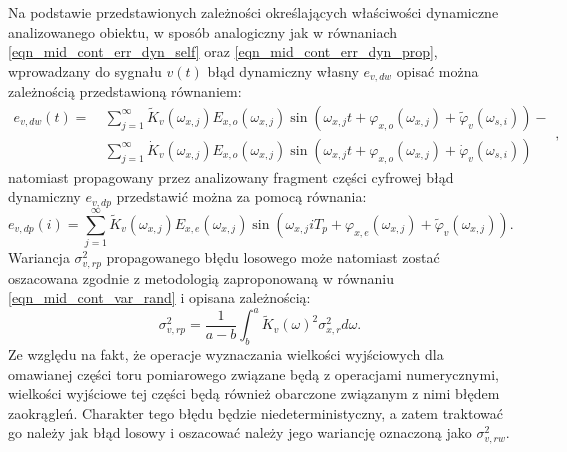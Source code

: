 Na podstawie przedstawionych zależności określających właściwości dynamiczne analizowanego obiektu, w sposób analogiczny jak w równaniach \eqref{eqn_mid_cont_err_dyn_self} oraz \eqref{eqn_mid_cont_err_dyn_prop}, wprowadzany do sygnału $v(t)$ błąd dynamiczny własny $e_{v,dw}$ opisać można zależnością przedstawioną równaniem:
\begin{equation}
\begin{split}
e_{v,dw}(t) = ~
& \sum _{j = 1} ^{\infty} \tilde{K}_{v}(\omega_{x,j}) E_{x,o}(\omega_{x,j}) \sin \left( \omega_{x,j} t + \varphi_{x,o}(\omega_{x,j}) + \tilde{\varphi}_{v}(\omega_{s,i}) \right) - \\
& \sum _{j = 1} ^{\infty} \dot{K}_{v}(\omega_{x,j}) E_{x,o}(\omega_{x,j}) \sin \left( \omega_{x,j} t + \varphi_{x,o}(\omega_{x,j}) + \dot{\varphi}_{v}(\omega_{s,i}) \right)
\end{split}
\label{eqn_mid_disc_err_dyn_self},
\end{equation}
natomiast propagowany przez analizowany fragment części cyfrowej błąd dynamiczny $e_{v,dp}$ przedstawić można za pomocą równania:
\begin{equation}
e_{v,dp}(i) = \sum _{j = 1} ^{\infty} \tilde{K}_{v}(\omega_{x,j}) E_{x,e}(\omega_{x,j}) \sin \left( \omega_{x,j} iT_{p} + \varphi_{x,e}(\omega_{x,j}) + \tilde{\varphi}_{v}(\omega_{x,j}) \right) \label{eqn_mid_disc_err_dyn_prop}.
\end{equation}
Wariancja $\sigma_{v,rp}^{2}$ propagowanego błędu losowego może natomiast zostać oszacowana zgodnie z metodologią zaproponowaną w równaniu \eqref{eqn_mid_cont_var_rand} i opisana zależnością:
\begin{equation}
\sigma_{v,rp}^{2} = \frac{1}{a - b} \int _{b} ^{a} \tilde{K}_{v}(\omega)^{2} \sigma_{x,r}^{2} d\omega  \label{eqn_mid_disc_var_rand}.
\end{equation}
Ze względu na fakt, że operacje wyznaczania wielkości wyjściowych dla omawianej części toru pomiarowego związane będą z operacjami numerycznymi, wielkości wyjściowe tej części będą również obarczone związanym z nimi błędem zaokrągleń. Charakter tego błędu będzie niedeterministyczny, a zatem traktować go należy jak błąd losowy i oszacować należy jego wariancję oznaczoną jako $\sigma_{v,rw}^{2}$.


